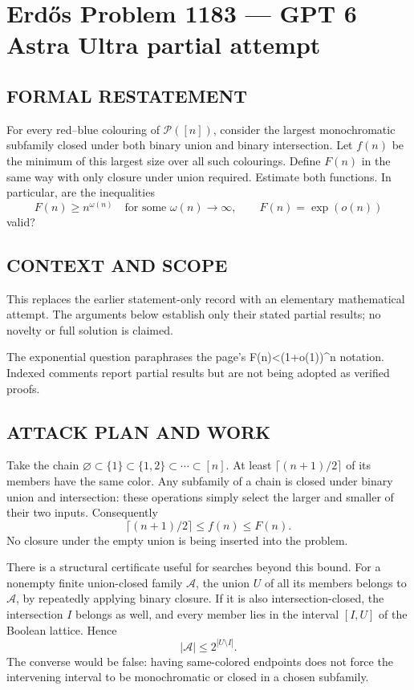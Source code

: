 \section*{Erd\H{o}s Problem 1183 --- GPT 6 Astra Ultra partial attempt}


\subsection*{FORMAL RESTATEMENT}
For every red--blue colouring of $\mathcal P([n])$, consider the largest monochromatic subfamily closed under both binary union and binary intersection. Let $f(n)$ be the minimum of this largest size over all such colourings. Define $F(n)$ in the same way with only closure under union required. Estimate both functions. In particular, are the inequalities
\[F(n)\geq n^{\omega(n)}\quad\text{for some }\omega(n)\to\infty,
\qquad F(n)=\exp(o(n))\]
valid?

\subsection*{CONTEXT AND SCOPE}
This replaces the earlier statement-only record with an elementary mathematical attempt. The arguments below establish only their stated partial results; no novelty or full solution is claimed.

The exponential question paraphrases the page's F(n)<(1+o(1))^n notation. Indexed comments report partial results but are not being adopted as verified proofs.

\subsection*{ATTACK PLAN AND WORK}
Take the chain
$\varnothing\subset\{1\}\subset\{1,2\}\subset\cdots\subset[n]$.
At least $\lceil(n+1)/2\rceil$ of its members have the same color.
Any subfamily of a chain is closed under binary union and intersection:
these operations simply select the larger and smaller of their two inputs.
Consequently
\[\lceil(n+1)/2\rceil\le f(n)\le F(n).\tag{1}\]
No closure under the empty union is being inserted into the problem.

There is a structural certificate useful for searches beyond this bound.
For a nonempty finite union-closed family $\mathcal A$, the union $U$ of all
its members belongs to $\mathcal A$, by repeatedly applying binary closure.
If it is also intersection-closed, the intersection $I$ belongs as well, and
every member lies in the interval $[I,U]$ of the Boolean lattice. Hence
\[|\mathcal A|\le2^{|U\setminus I|}.\tag{2}\]
The converse would be false: having same-colored endpoints does not force
the intervening interval to be monochromatic or closed in a chosen subfamily.

